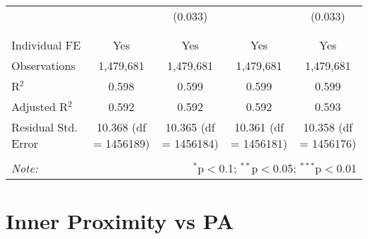 \documentclass[
]{article}
\begin{document}
\begin{table}[!htbp]
{\begin{tabular}{@{\extracolsep{5pt}}lcccc}
  &  & (0.033) &  & (0.033) \\ 
  & & & & \\ 
\hline \\[-1.8ex] 
Individual FE & Yes & Yes & Yes & Yes \\ 
Observations & 1,479,681 & 1,479,681 & 1,479,681 & 1,479,681 \\ 
R$^{2}$ & 0.598 & 0.599 & 0.599 & 0.599 \\ 
Adjusted R$^{2}$ & 0.592 & 0.592 & 0.592 & 0.593 \\ 
Residual Std. Error & 10.368 (df = 1456189) & 10.365 (df = 1456184) & 10.361 (df = 1456181) & 10.358 (df = 1456176) \\ 
\hline 
\hline \\[-1.8ex] 
\textit{Note:}  & \multicolumn{4}{r}{$^{*}$p$<$0.1; $^{**}$p$<$0.05; $^{***}$p$<$0.01} \\ 
\end{tabular}
} 
\end{table} 
\newpage
\section{Inner Proximity vs PA}
\end{document}
